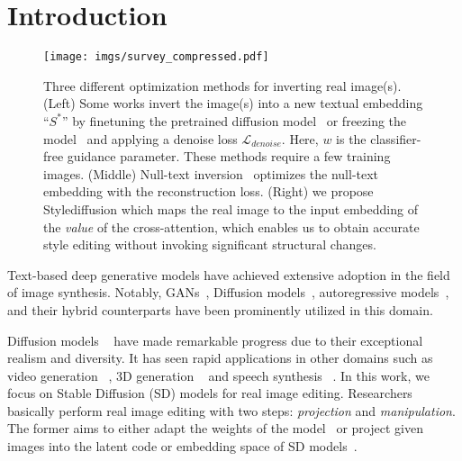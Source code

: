 \documentclass[twocolumn]{svjour3}          \smartqed  \usepackage{graphicx}
\begin{document}
\section{Introduction}
\label{intro}

\begin{figure*}[t]
    \centering
\texttt{[image: imgs/survey\_compressed.pdf]}\vspace{-2mm}
        \caption{Three different optimization methods for inverting real image(s). (Left) Some works invert the image(s) into a new textual embedding “$S^{*}$” by finetuning the pretrained diffusion model~\citep{Kawar2022ImagicTR, valevski2022unitune, ruiz2022dreambooth} or freezing the model~\citep{kumari2022multi} and applying a denoise loss $\mathcal{L}_{denoise}$. 
        Here, $w$ is the classifier-free guidance parameter. These methods require a few training images. 
        (Middle) Null-text inversion~\citep{mokady2022null} optimizes the null-text embedding with the reconstruction loss. (Right) we propose Stylediffusion which maps the real image to the input embedding of the \textit{value} of the cross-attention, which enables us to obtain accurate style editing without invoking significant structural changes.}
    \label{fig:survey}\vspace{-2mm}
\end{figure*}




Text-based deep generative models have achieved extensive adoption in the field of image synthesis. Notably, GANs~\citep{patashnik2021styleclip,gal2021stylegan,kang2023gigagan,Sauer2023ICML}, Diffusion models~\citep{saharia2022photorealistic,ramesh2022hierarchical,gafni2022make}, autoregressive models~\citep{yu2022scaling}, and their hybrid counterparts have been prominently utilized in this domain.

Diffusion models ~\citep{ramesh2022hierarchical,saharia2022photorealistic,rombach2021highresolution} have made remarkable progress due to their exceptional realism and diversity. It has seen rapid applications in other domains such as video generation ~\citep{khachatryan2023text2video,wu2022tune,zhou2022magicvideo}, 3D generation ~\citep{poole2022dreamfusion,lin2023magic3d,wang2023prolificdreamer} and speech synthesis ~\citep{jeong2021diff,huang2022fastdiff,koizumi2022specgrad}.  In this work, we focus on Stable Diffusion (SD) models for real image editing.
Researchers basically perform real image editing with two steps: \textit{projection} and \textit{manipulation}. The former aims to either adapt the weights of the model~\citep{song2020denoising,liu2023accelerating,kim2022diffusionclip,xiao2023fastcomposer} or project given
images into the latent code or embedding space of SD models~\citep{mokady2022null,gal2022image,avrahami2023break,han2023highly}.
\end{document}
